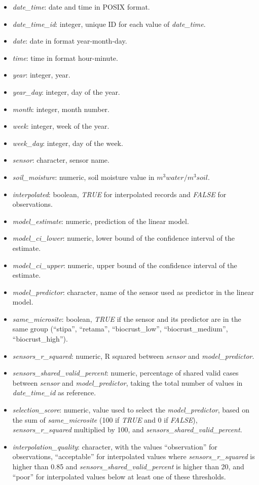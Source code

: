\documentclass[
  table]{article}
\providecommand{\tightlist}{%
  \setlength{\itemsep}{0pt}\setlength{\parskip}{0pt}}
\begin{document}
\begin{itemize}
\tightlist
\item
  \emph{date\_time}: date and time in POSIX format.
\item
  \emph{date\_time\_id}: integer, unique ID for each value of
  \emph{date\_time}.
\item
  \emph{date}: date in format year-month-day.
\item
  \emph{time}: time in format hour-minute.
\item
  \emph{year}: integer, year.
\item
  \emph{year\_day}: integer, day of the year.
\item
  \emph{month}: integer, month number.
\item
  \emph{week}: integer, week of the year.
\item
  \emph{week\_day}: integer, day of the week.
\item
  \emph{sensor}: character, sensor name.
\item
  \emph{soil\_moisture}: numeric, soil moisture value in
  \(m^{3} water /m^{3} soil\).
\item
  \emph{interpolated}: boolean, \emph{TRUE} for interpolated records and
  \emph{FALSE} for observations.
\item
  \emph{model\_estimate}: numeric, prediction of the linear model.
\item
  \emph{model\_ci\_lower}: numeric, lower bound of the confidence
  interval of the estimate.
\item
  \emph{model\_ci\_upper}: numeric, upper bound of the confidence
  interval of the estimate.
\item
  \emph{model\_predictor}: character, name of the sensor used as
  predictor in the linear model.
\item
  \emph{same\_microsite}: boolean, \emph{TRUE} if the sensor and its
  predictor are in the same group (``stipa'', ``retama'',
  ``biocrust\_low'', ``biocrust\_medium'', ``biocrust\_high'').
\item
  \emph{sensors\_r\_squared}: numeric, R squared between \emph{sensor}
  and \emph{model\_predictor}.
\item
  \emph{sensors\_shared\_valid\_percent}: numeric, percentage of shared
  valid cases between \emph{sensor} and \emph{model\_predictor}, taking
  the total number of values in \emph{date\_time\_id} as reference.
\item
  \emph{selection\_score}: numeric, value used to select the
  \emph{model\_predictor}, based on the sum of \emph{same\_microsite}
  (100 if \emph{TRUE} and 0 if \emph{FALSE}), \emph{sensors\_r\_squared}
  multiplied by 100, and \emph{sensors\_shared\_valid\_percent}.
\item
  \emph{interpolation\_quality}: character, with the values
  ``observation'' for observations, ``acceptable'' for interpolated
  values where \emph{sensors\_r\_squared} is higher than 0.85 and
  \emph{sensors\_shared\_valid\_percent} is higher than 20, and ``poor''
  for interpolated values below at least one of these thresholds.
\end{itemize}
\end{document}
